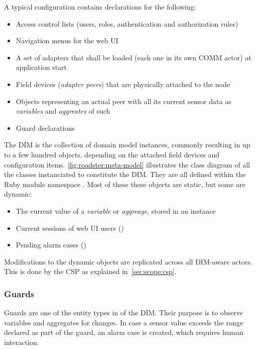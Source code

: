 A typical configuration contains declarations for the following:
\begin{itemize}
	\item Access control lists (users, roles, authentication and authorization rules)
	\item Navigation menus for the web UI
	\item A set of adapters that shall be loaded (each one in its own COMM
		actor) at application start
	\item Field devices (\emph{adapter peers}) that are physically attached to the node
	\item Objects representing an actual peer with all its current sensor data as \emph{variables} and \emph{aggreates} of such
	\item Guard declarations
\end{itemize}

The DIM is the collection of domain model instances, commonly resulting in up
to a few hundred objects, depending on the attached field devices and
configuration items.
\autoref{fig:roadster:meta-model} illustrates the class diagram of
all the classes instanciated to constitute the DIM. They are all defined within the
Ruby module namespace .
Most of these these objects are static, but some are dynamic:


\begin{itemize}
	\item The current value of a \emph{variable} or \emph{aggreage}, stored in an  instance
	\item Current sessions of web UI users ()
	\item Pending alarm cases ()
\end{itemize}


Modifications to the dynamic objects are replicated across all DIM-aware
actors. This is done by the \gls{CSP} as explained in~\autoref{sec:scope:csp}.

\subsubsection{Guards}
Guards are one of the entity types in of the DIM. Their purpose is to observe
variables and aggregates for changes. In case a sensor value exceeds the range
declared as part of the guard, an alarm case is created, which requires
human interaction.

